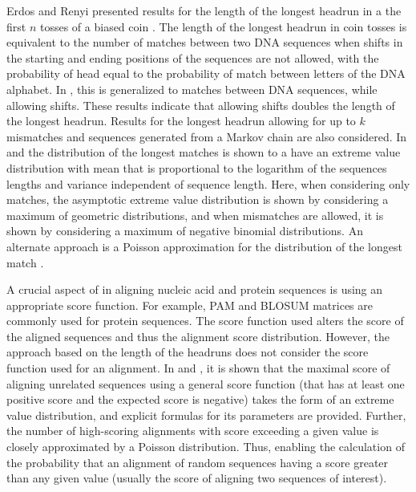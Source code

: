 Erdos and Renyi presented results for the length of the longest headrun
in a the first $n$ tosses of a biased coin \citep{erdos1975length}.  The
length of the longest headrun in coin tosses is equivalent to the number
of matches between two DNA sequences when shifts in the starting and
ending positions of the sequences are not allowed, with the probability
of head equal to the probability of match between letters of the DNA
alphabet.
In \cite{arratia1985erdos}, this is generalized to matches between DNA
sequences, while allowing shifts. These results indicate that allowing
shifts doubles the length of the longest headrun. Results for the
longest headrun allowing for up to $k$ mismatches and sequences
generated from a Markov chain are also considered.
In \cite{arratia1986extreme} and \cite{gordon1986extreme} the
distribution of the longest matches is shown to a have an extreme value
distribution with mean that is proportional to the logarithm of the
sequences lengths and variance independent of sequence length. Here,
when considering only matches, the asymptotic extreme value distribution
is shown by considering a maximum of geometric distributions, and when
mismatches are allowed, it is shown by considering a maximum of negative
binomial distributions.
An alternate approach is a Poisson approximation for the distribution of
the longest match \citep{arratia1989erdos}.

A crucial aspect of in aligning nucleic acid and protein sequences is
using an appropriate score function. For example, PAM
\citep{dayhoff197822} and BLOSUM \citep{henikoff1992amino} matrices are
commonly used for protein sequences.  The score function used alters the
score of the aligned sequences and thus the alignment score
distribution.
However, the approach based on the length of the headruns does not
consider the score function used for an alignment.
%
In \cite{karlin1990methods} and \cite{karlin1990statistical}, it is
shown that the maximal score of aligning unrelated sequences using a
general score function (that has at least one positive score and the
expected score is negative) takes the form of an extreme value
distribution, and explicit formulas for its parameters are provided.
Further, the number of high-scoring alignments with score exceeding a
given value is closely approximated by a Poisson distribution.
%
Thus, enabling the calculation of the probability that an alignment of
random sequences having a score greater than any given value (usually
the score of aligning two sequences of interest).

